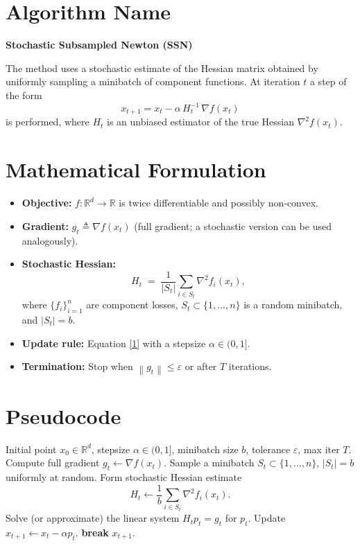 \documentclass{article}
\newcommand{\R}{\mathbb{R}}
\newcommand{\norm}[1]{\left\|#1\right\|}
\newcommand{\grad}{\nabla}
\begin{document}
\section*{Algorithm Name}
\textbf{Stochastic Subsampled Newton (SSN)}  

The method uses a stochastic estimate of the Hessian matrix obtained by uniformly sampling a minibatch of component functions.  
At iteration $t$ a step of the form
\[
x_{t+1}=x_t-\alpha\, H_t^{-1}\,\grad f(x_t)
\tag{1}
\]
is performed, where $H_t$ is an unbiased estimator of the true Hessian $\nabla^2 f(x_t)$.

\section*{Mathematical Formulation}
\begin{itemize}
    \item \textbf{Objective:} $f:\R^d\to\R$ is twice differentiable and possibly non‑convex.
    \item \textbf{Gradient:} $g_t\triangleq \grad f(x_t)$ (full gradient; a stochastic version can be used analogously).
    \item \textbf{Stochastic Hessian:}
    \[
        H_t \;=\; \frac{1}{|S_t|}\sum_{i\in S_t}\nabla^2 f_i(x_t),
    \]
    where $\{f_i\}_{i=1}^n$ are component losses, $S_t\subset\{1,\dots,n\}$ is a random minibatch, and $|S_t|=b$.
    \item \textbf{Update rule:} Equation \eqref{1} with a stepsize $\alpha\in(0,1]$.
    \item \textbf{Termination:} Stop when $\norm{g_t}\leq\varepsilon$ or after $T$ iterations.
\end{itemize}

\section*{Pseudocode}
\begin{algorithm}[H]
\caption{Stochastic Subsampled Newton (SSN)}\label{alg:ssn}
\begin{algorithmic}[1]
\Require Initial point $x_0\in\R^d$, stepsize $\alpha\in(0,1]$, minibatch size $b$, tolerance $\varepsilon$, max iter $T$.
    \State Compute full gradient $g_t\gets \grad f(x_t)$.
    \State Sample a minibatch $S_t\subset\{1,\dots,n\}$, $|S_t|=b$ uniformly at random.
    \State Form stochastic Hessian estimate
          \[
              H_t\gets \frac{1}{b}\sum_{i\in S_t}\nabla^2 f_i(x_t).
          \]
    \State Solve (or approximate) the linear system $H_t p_t = g_t$ for $p_t$.
    \State Update $x_{t+1}\gets x_t-\alpha p_t$.
    \If{$\norm{g_t}\le \varepsilon$}
        \State \textbf{break}
    \EndIf
\EndFor
\State \Return $x_{t+1}$.
\end{algorithmic}
\end{algorithm}
\end{document}
